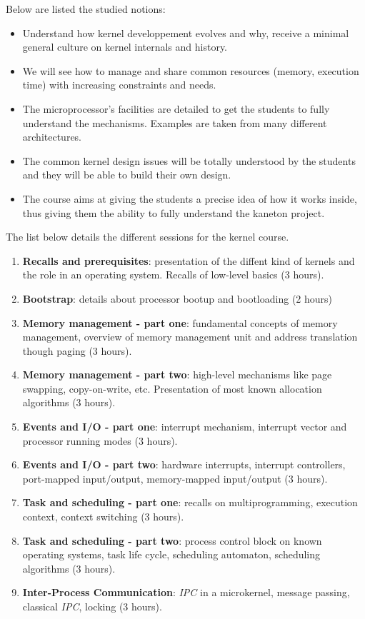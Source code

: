 \begin{multicols}{2}
Below are listed the studied notions:

\begin{itemize}
  \item
    Understand how kernel developpement evolves and why, receive a
    minimal general culture on kernel internals and history.
  \item
    We will see how to manage and share common resources (memory,
    execution time) with increasing constraints and needs.
  \item
    The microprocessor's facilities are detailed to get the students
    to fully understand the mechanisms. Examples are taken from
    many different architectures.
  \item
    The common kernel design issues will be totally understood by the
    students and they will be able to build their own design.
  \item
    The course aims at giving the students a precise idea of how it
    works inside, thus giving them the ability to fully understand
    the kaneton project.
\end{itemize}

The list below details the different sessions for the kernel course.

\begin{enumerate}
  \item
    \textbf{Recalls and prerequisites}: presentation of the diffent
    kind of kernels and the role in an operating system. Recalls of
    low-level basics (3 hours).
  \item
    \textbf{Bootstrap}: details about processor bootup and bootloading
    (2 hours)
\item
    \textbf{Memory management - part one}: fundamental concepts of
    memory management, overview of memory management unit and address
    translation though paging (3 hours).
  \item
    \textbf{Memory management - part two}: high-level mechanisms like
    page swapping, copy-on-write, etc. Presentation of most known
    allocation algorithms (3 hours).
  \item
    \textbf{Events and I/O - part one}: interrupt mechanism, interrupt
    vector and processor running modes (3 hours).
  \item
    \textbf{Events and I/O - part two}: hardware interrupts, interrupt
    controllers, port-mapped input/output, memory-mapped input/output
    (3 hours).
  \item
    \textbf{Task and scheduling - part one}: recalls on
    multiprogramming, execution context, context switching (3 hours).
  \item
    \textbf{Task and scheduling - part two}: process control block on
    known operating systems, task life cycle, scheduling automaton,
    scheduling algorithms (3 hours).
  \item
    \textbf{Inter-Process Communication}: \textit{IPC} in a microkernel,
    message passing, classical \textit{IPC}, locking (3 hours).
\end{enumerate}


\end{multicols}
